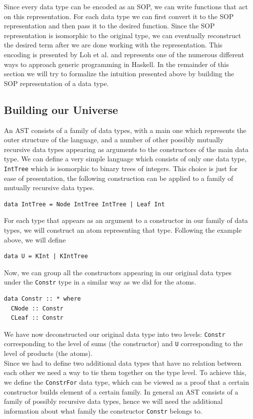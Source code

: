 \documentclass[11pt, titlepage]{article}
\begin{document}
Since every data type can be encoded as an SOP, we can write functions 
that act on this representation. For each data type 
we can first convert it to the SOP representation and then pass it to 
the desired function. Since the SOP representation is isomorphic to the original type, we can eventually reconstruct the 
desired term after we are done working with the representation. This encoding is 
presented by Loh et al. \cite{true-sop} and represents one of the numerous different ways to 
approach generic programming in Haskell. 
In the remainder of this section we will try to formalize the intuition presented 
above by building the SOP representation of a data type. 

\subsection{Building our Universe}\label{universe}

An AST consists of a family of data types, with a main one which
represents the outer structure of the language, and a number of other
possibly mutually recursive data types appearing as arguments to the
constructors of the main data type. We can define a very simple language which 
consists of only one data type, \texttt{IntTree} which is isomorphic to binary trees 
of integers. This choice is just for ease of presentation, the following construction 
can be applied to a family of mutually recursive data types.

\begin{verbatim}
data IntTree = Node IntTree IntTree | Leaf Int
\end{verbatim}

For each type that appears as an argument to a constructor in our family
of data types, we will construct an atom representing that type.
Following the example above, we will define

\begin{verbatim}
data U = KInt | KIntTree 
\end{verbatim}

Now, we can group all the constructors appearing in our original
data types under the \texttt{Constr} type in a similar way as we
did for the atoms. 

\begin{verbatim}
data Constr :: * where
  CNode :: Constr
  CLeaf :: Constr
\end{verbatim}

We have now deconstructed our original data type into two levels: \texttt{Constr} corresponding to the level of sums (the constructor) 
and  \texttt{U} corresponding to the level of products (the atoms).
\\
Since we had to define two additional data types that have no relation between 
each other we need a way to tie them together on the type level.
To achieve this, we define the \texttt{ConstrFor} data type,
which can be viewed as a proof that a certain constructor builds element
of a certain family. In general an AST consists of a family of possibly 
recursive data types, hence we will need the additional information about what 
family the constructor \texttt{Constr} belongs to.
\end{document}
